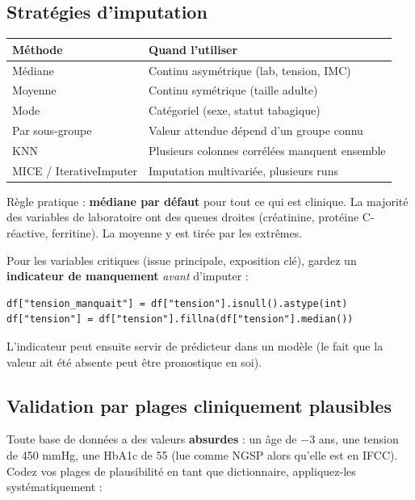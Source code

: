 \documentclass[11pt,a4paper]{article}
\begin{document}
\subsection{Strat\'egies d'imputation}

\begin{table}[h]
\centering
\small
\begin{tabular}{ll}
\toprule
\bfseries M\'ethode & \bfseries Quand l'utiliser \\
\midrule
M\'ediane           & Continu asym\'etrique (lab, tension, IMC) \\
Moyenne             & Continu sym\'etrique (taille adulte) \\
Mode                & Cat\'egoriel (sexe, statut tabagique) \\
Par sous-groupe     & Valeur attendue d\'epend d'un groupe connu \\
KNN                 & Plusieurs colonnes corr\'el\'ees manquent ensemble \\
MICE / IterativeImputer & Imputation multivari\'ee, plusieurs runs \\
\bottomrule
\end{tabular}
\end{table}

R\`egle pratique : \textbf{m\'ediane par d\'efaut} pour tout ce qui est
clinique. La majorit\'e des variables de laboratoire ont des queues
droites (cr\'eatinine, prot\'eine C-r\'eactive, ferritine). La moyenne y
est tir\'ee par les extr\^emes.

Pour les variables critiques (issue principale, exposition cl\'e), gardez
un \textbf{indicateur de manquement} \emph{avant} d'imputer :

\begin{verbatim}
df["tension_manquait"] = df["tension"].isnull().astype(int)
df["tension"] = df["tension"].fillna(df["tension"].median())
\end{verbatim}

L'indicateur peut ensuite servir de pr\'edicteur dans un mod\`ele (le
fait que la valeur ait \'et\'e absente peut \^etre pronostique en soi).

\subsection{Validation par plages cliniquement plausibles}

Toute base de donn\'ees a des valeurs \textbf{absurdes} : un \^age de
$-3$ ans, une tension de 450 mmHg, une HbA1c de 55 (lue comme NGSP
alors qu'elle est en IFCC). Codez vos plages de plausibilit\'e en tant
que dictionnaire, appliquez-les syst\'ematiquement :
\end{document}

